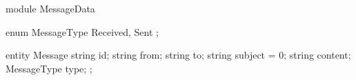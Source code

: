 module MessageData {
   enum MessageType { Received, Sent }; 
 
   entity Message {
     string id;
     string from;
     string to;
     string subject = 0;
     string content; 
     MessageType type;
   }; 
}
